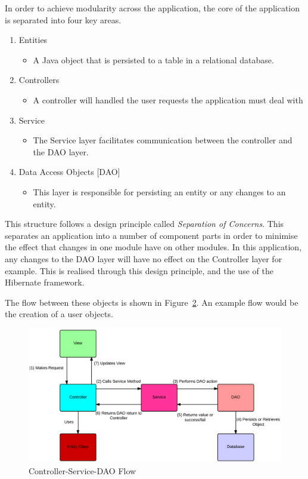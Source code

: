 In order to achieve modularity across the application, the core of the application is separated into four key areas.


\begin{enumerate}
\item Entities
\begin{itemize}
\item A Java object that is persisted to a table in a relational database.
\end{itemize}
\item Controllers
\begin{itemize}
\item A controller will handled the user requests the application must deal with
\end{itemize}
\item Service
\begin{itemize}
\item The Service layer facilitates communication between the controller and the DAO layer.
\end{itemize}
\item Data Access Objects [DAO]
\begin{itemize}
\item This layer is responsible for persisting an entity or any changes to an entity.
\end{itemize}
\end{enumerate}
\begin{figure}[H]
\label{fig:appbreakdown}
\end{figure}

This structure follows a design principle called \textit{Separation of Concerns}. This separates an application into a number of component parts in order to minimise the effect that changes in one module have on other modules. In this application, any changes to the DAO layer will have no effect on the Controller layer for example. This is realised through this design principle, and the use of the Hibernate framework.

The flow between these objects is shown in Figure~\ref{fig:csdao}. An example flow would be the creation of a user objects. 

\begin{figure}[H]
\begin{center}
\includegraphics[width=14cm]{csdao.png}
\end{center}
\caption{Controller-Service-DAO Flow}
\label{fig:csdao}
\end{figure}

